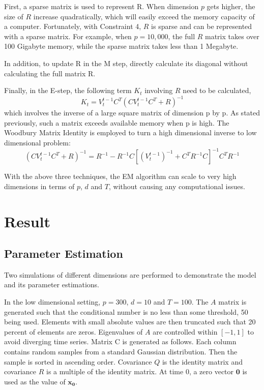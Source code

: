 \documentclass[fleqn]{article}
\newcommand{\T}{T}
\begin{document}
First, a sparse matrix is used to represent R. When dimension $p$ gets higher, the size of $R$ increase quadratically, which will easily exceed the memory capacity of a computer.  Fortunately, with Constraint 4, $R$ is sparse and can be represented with a sparse matrix. For example, when $p=10,000$, the full $R$ matrix takes over 100 Gigabyte memory, while the sparse matrix takes less than 1 Megabyte.

In addition, to update R in the M step, directly calculate its diagonal without calculating the full matrix R.

Finally, in the E-step, the following term $K_t$ involving $R$ need to be calculated,
\[
K_t=V_t^{t-1}C^{\T}(CV_t^{t-1}C^{\T}+R)^{-1}
\]
which involves the inverse of a large square matrix of dimension p by p. As stated previously, such a matrix exceeds available memory when p is high. The Woodbury Matrix Identity is employed to turn a high dimensional inverse to low dimensional problem:
\[
(CV_t^{t-1}C^{\T}+R)^{-1} = R^{-1} - R^{-1}C[(V_t^{t-1})^{-1} + C^{\T}R^{-1}C]^{-1}C^{\T}R^{-1}
\]

With the above three techniques, the EM algorithm can scale to very high dimensions in terms of $p$, $d$ and $T$, without causing any computational issues.



\section{Result}
\subsection{Parameter Estimation}
\label{sec:lowdsim}
Two simulations of different dimensions are performed to demonstrate the model and its parameter estimations.

In the low dimensional setting, $p = 300$, $d = 10$ and $T = 100$. The $A$ matrix is generated such that the conditional number is no less than some threshold, 50 being used. Elements with small absolute values are then truncated such that 20 percent of elements are zeros. Eigenvalues of $A$ are controlled within $[-1,1]$ to avoid diverging time series. Matrix C is generated as follows. Each column contains random samples from a standard Gaussian distribution. Then the sample is sorted in ascending order. Covariance $Q$ is the identity matrix and covariance $R$ is a multiple of the identity matrix. At time 0, a zero vector $\mathbf{0}$ is used as the value of $\mathbf{x_0}$.
\end{document}
